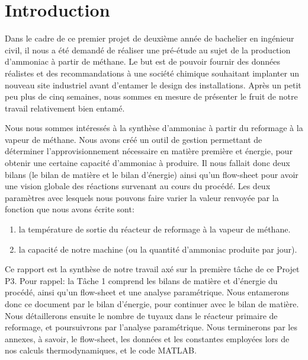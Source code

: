\section{Introduction}

Dans le cadre de ce premier projet de deuxième année de bachelier en ingénieur civil, il nous a été demandé
de réaliser une pré-étude au sujet de la production d'ammoniac à partir de méthane. Le but est de pouvoir fournir
des données réalistes et des recommandations à une société chimique souhaitant implanter un nouveau site industriel
avant d’entamer le design des installations. Après un petit peu plus de cinq semaines, nous sommes en
mesure de présenter le fruit de notre travail relativement bien entamé. 

Nous nous sommes intéressés à la synthèse d’ammoniac à partir du reformage à la vapeur de méthane. Nous avons
créé un outil de gestion permettant de déterminer l’approvisionnement nécessaire en matière première et énergie, pour
obtenir une certaine capacité d'ammoniac à produire. Il nous fallait donc deux bilans (le bilan de matière et le
bilan d'énergie) ainsi qu'un flow-sheet pour avoir une vision globale des réactions survenant au cours du procédé. Les
deux paramètres avec lesquels nous pouvons faire varier la valeur renvoyée par la fonction que nous avons écrite sont:

\begin{enumerate}
\item la température de sortie du réacteur de reformage à la vapeur de méthane.
\item la capacité de notre machine (ou la quantité d'ammoniac  produite par jour).
\end{enumerate}


Ce rapport est la synthèse de notre travail axé sur la première tâche de ce Projet P3. Pour rappel: la Tâche 1 comprend
les bilans de matière et d’énergie du procédé, ainsi qu'un flow-sheet et une analyse paramétrique. Nous entamerons donc ce
document par le bilan d'énergie, pour continuer avec le bilan de matière. Nous détaillerons ensuite le nombre de tuyaux
dans le réacteur primaire de reformage, et poursuivrons par l'analyse paramétrique. Nous terminerons par les annexes, à
savoir, le flow-sheet, les données et les constantes employées lors de nos calculs thermodynamiques, et le code \textsc{MATLAB}.		
